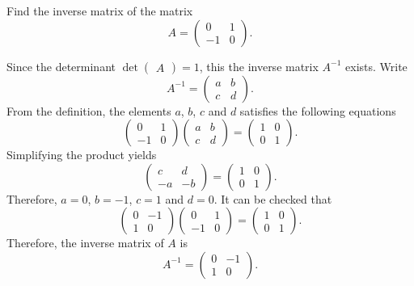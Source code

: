\begin{example}
  Find the inverse matrix of the matrix
  \[
    A=\begin{pmatrix}
    0 & 1\\
    -1 & 0
  \end{pmatrix}.
  \]
\end{example}
\begin{solution}
  Since the determinant $\det\begin{pmatrix} A \end{pmatrix}=1$, this the inverse matrix $A^{-1}$ exists. Write
  \[A^{-1}=\begin{pmatrix}
    a & b\\
    c & d
  \end{pmatrix}.\]
  From the definition, the elements $a$, $b$, $c$ and $d$ satisfies the following equations
  \[\begin{pmatrix}
    0 & 1\\
    -1 & 0
  \end{pmatrix}\begin{pmatrix}
    a & b\\
    c & d
  \end{pmatrix}=\begin{pmatrix}
    1 & 0\\
    0 & 1
  \end{pmatrix}.\]
  Simplifying the product yields
  \[\begin{pmatrix}
    c & d\\
    -a & -b
  \end{pmatrix}=\begin{pmatrix}
    1 & 0\\
    0 & 1
  \end{pmatrix}.\]
  Therefore, $a=0$, $b=-1$, $c=1$ and $d=0$.
  It can be checked that 
  \[\begin{pmatrix}
    0 & -1\\
    1 & 0
  \end{pmatrix}\begin{pmatrix}
    0 & 1\\
    -1 & 0
  \end{pmatrix}=\begin{pmatrix}
    1 & 0\\
    0 & 1
  \end{pmatrix}.
  \]
  Therefore, the inverse matrix of $A$ is
  \[A^{-1}=\begin{pmatrix}
    0 & -1\\
    1 & 0
  \end{pmatrix}.\]
\end{solution}

